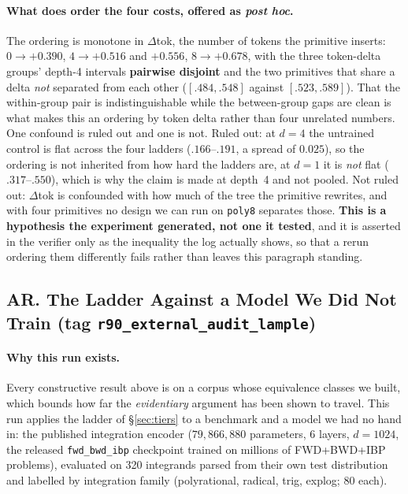 \paragraph{What does order the four costs, offered as \emph{post hoc}.} The ordering is monotone in $\Delta$tok, the number of tokens the primitive inserts: $0 \to +0.390$, $4 \to +0.516$ and $+0.556$, $8 \to +0.678$, with the three token-delta groups' depth-4 intervals \textbf{pairwise disjoint} and the two primitives that share a delta \emph{not} separated from each other ($[.484,.548]$ against $[.523,.589]$). That the within-group pair is indistinguishable while the between-group gaps are clean is what makes this an ordering by token delta rather than four unrelated numbers. One confound is ruled out and one is not. Ruled out: at $d{=}4$ the untrained control is flat across the four ladders ($.166$--$.191$, a spread of $0.025$), so the ordering is not inherited from how hard the ladders are, at $d{=}1$ it is \emph{not} flat ($.317$--$.550$), which is why the claim is made at depth~4 and not pooled. Not ruled out: $\Delta$tok is confounded with how much of the tree the primitive rewrites, and with four primitives no design we can run on \texttt{poly8} separates those. \textbf{This is a hypothesis the experiment generated, not one it tested}, and it is asserted in the verifier only as the inequality the log actually shows, so that a rerun ordering them differently fails rather than leaves this paragraph standing.

\subsection*{AR. The Ladder Against a Model We Did Not Train (tag \texttt{r90\_external\_audit\_lample})}

\paragraph{Why this run exists.} Every constructive result above is on a corpus whose equivalence classes we built, which bounds how far the \emph{evidentiary} argument has been shown to travel. This run applies the ladder of \S\ref{sec:tiers} to a benchmark and a model we had no hand in: the published \citet{lample2019deep} integration encoder ($79{,}866{,}880$ parameters, 6 layers, $d{=}1024$, the released \texttt{fwd\_bwd\_ibp} checkpoint trained on millions of FWD+BWD+IBP problems), evaluated on 320 integrands parsed from their own test distribution and labelled by integration family (polyrational, radical, trig, explog; 80 each).

